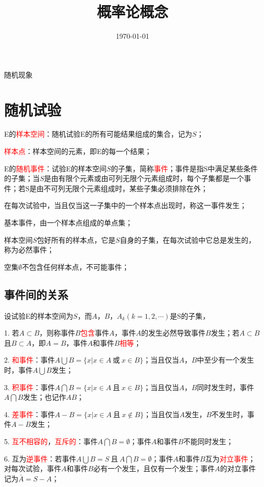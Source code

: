 \documentclass[12pt,a4paper]{article}
\title{概率论概念}
\author{}
\date{\today}
\begin{document}
\maketitle

随机现象

\section{随机试验}

E的\textcolor{red}{样本空间}：随机试验E的所有可能结果组成的集合，记为$S$；

\textcolor{red}{样本点}：样本空间的元素，即E的每一个结果；

E的\textcolor{red}{随机事件}：试验E的样本空间$S$的子集，简称\textcolor{red}{事件}；事件是指S中满足某些条件的子集；当$S$是由有限个元素或由可列无限个元素组成时，每个子集都是一个事件；若S是由不可列无限个元素组成时，某些子集必须排除在外；

在每次试验中，当且仅当这一子集中的一个样本点出现时，称这一事件发生；

基本事件，由一个样本点组成的单点集；

样本空间$S$包好所有的样本点，它是$S$自身的子集，在每次试验中它总是发生的，称为必然事件；

空集$\emptyset$不包含任何样本点，不可能事件；

\subsection{事件间的关系}
设试验E的样本空间为$S$，而$A$，$B$，$A_k (k = 1, 2, \cdots)$是S的子集，

1. 若$A\subset B$，则称事件$B$\textcolor{red}{包含}事件$A$，事件$A$的发生必然导致事件$B$发生；若$A\subset B$且$B\subset A$，即$A=B$，事件$A$和事件$B$\textcolor{red}{相等}；

2. \textcolor{red}{和事件}：事件$A\bigcup B = \{x | x \in A ~\text{或} ~ x \in B\}$；当且仅当$A$，$B$中至少有一个发生时，事件$A\bigcup B$发生；

3. \textcolor{red}{积事件}：事件$A\bigcap B = \{x | x \in A ~\text{且} ~ x \in B\}$；当且仅当$A$，$B$同时发生时，事件$A\bigcap B$发生；也记作$AB$；

4. \textcolor{red}{差事件}：事件$A - B = \{x | x \in A ~\text{且} ~ x \notin B\}$；当且仅当$A$发生，$B$不发生时，事件$A- B$发生；

5. \textcolor{red}{互不相容的}，\textcolor{red}{互斥的}：事件$A\bigcap B = \emptyset$；事件$A$和事件$B$不能同时发生；

6. 互为\textcolor{red}{逆事件}：若事件$A\bigcup B = S ~\text{且} ~ A\bigcap B = \emptyset$；事件$A$和事件$B$互为\textcolor{red}{对立事件}；对每次试验，事件$A$和事件$B$必有一个发生，且仅有一个发生；事件$A$的对立事件记为$\bar{A} = S - A$；
\end{document}
